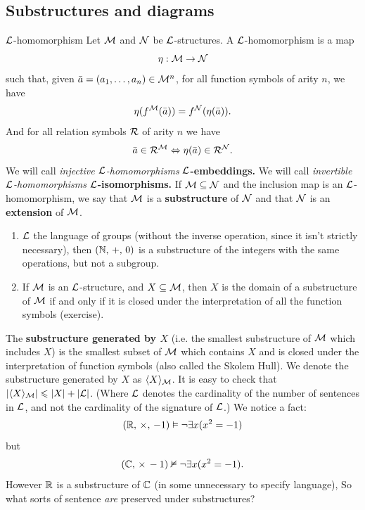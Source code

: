 \documentclass{article}
\numberwithin{thm}{subsection}
\begin{document}
\subsection{Substructures and diagrams}
\begin{fancydefine}{$\mathcal{L}$-homomorphism}
    Let $\mathcal{M}$ and $\mathcal{N}$ be $\mathcal{L}$-structures. A $\mathcal{L}$-homomorphism is a map \[
    \eta : \mathcal{M} \to \mathcal{N} \]
    such that, given $\bar{a}=(a_{1},\dots,a_{n}) \in \mathcal{M}^n $, for all function symbols of arity $n$, we have \[
    \eta(f^{\mathcal{M}}(\bar{a})) = f^{\mathcal{N}}(\eta(\bar{a})). \] And for all relation symbols $\mathcal{R}$ of arity $n$ we have \[ \bar{a} \in \mathcal{R}^{\mathcal{M}} \Leftrightarrow \eta(\bar{a}) \in \mathcal{R}^{\mathcal{N}}.\]
    We will call \textit{injective $\mathcal{L}$-homomorphisms} $\mathcal{L}$\textbf{-embeddings.} We will call \textit{invertible $\mathcal{L}$-homomorphisms} $\mathcal{L}$\textbf{-isomorphisms.}
    \gap
    If $\mathcal{M} \subseteq \mathcal{N}$ and the inclusion map is an $\mathcal{L}$-homomorphism, we say that $\mathcal{M}$ is a \textbf{substructure} of $\mathcal{N}$ and that $\mathcal{N}$ is an \textbf{extension} of $\mathcal{M}$.
\end{fancydefine}
\ex \hspace{0.1cm}
\begin{enumerate}
    \item $\mathcal{L}$ the language of groups (without the inverse operation, since it isn't strictly necessary), then $(\mathbb{N}, \, +, \, 0)$ is a substructure of the integers with the same operations, but not a subgroup.
    \item If $\mathcal{M}$ is an $\mathcal{L}$-structure, and $X \subseteq \mathcal{M}$, then $X$ is the domain of a substructure of $\mathcal{M}$ if and only if it is closed under the interpretation of all the function symbols (exercise).
\end{enumerate}
The \textbf{substructure generated by $X$} (i.e. the smallest substructure of $\mathcal{M}$ which includes $X$) is the smallest subset of $\mathcal{M}$ which contains $X$ and is closed under the interpretation of function symbols (also called the Skolem Hull). \gap
We denote the substructure generated by $X$ as $\langle X \rangle_{\mathcal{M}}$. It is easy to check that $|\langle X \rangle_{\mathcal{M}}| \leqslant |X| + |\mathcal{L}|$. (Where $\mathcal{L}$ denotes the cardinality of the number of sentences in $\mathcal{L}$, and not the cardinality of the signature of $\mathcal{L}$.) \gap
We notice a fact:
\[ (\mathbb{R}, \, \times, \, -1) \vDash \neg \exists x (x^{2} = -1) \]
but
\[ (\mathbb{C}, \, \times \, -1) \nvDash \neg \exists x (x^{2} = -1). \]
However $\mathbb{R}$ is a substructure of $\mathbb{C}$ (in some unnecessary to specify language), So what sorts of sentence \textit{are} preserved under substructures? \gap
\end{document}
